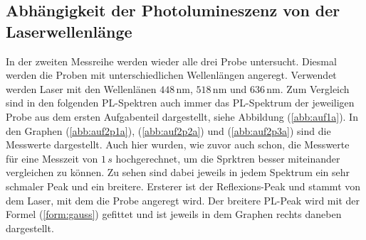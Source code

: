\subsection{Abhängigkeit der Photolumineszenz von der Laserwellenlänge}
In der zweiten Messreihe werden wieder alle drei Probe untersucht.
Diesmal werden die Proben mit unterschiedlichen Wellenl\"{a}ngen angeregt.
Verwendet werden Laser mit den Wellenl\"{a}nen $448 \,$nm, $518 \,$nm und $636 \,$nm.
Zum Vergleich sind in den folgenden PL-Spektren auch immer das PL-Spektrum der jeweiligen Probe aus dem ersten Aufgabenteil dargestellt, siehe Abbildung (\ref{abb:auf1a}).
In den Graphen (\ref{abb:auf2p1a}), (\ref{abb:auf2p2a}) und (\ref{abb:auf2p3a}) sind die Messwerte dargestellt.
Auch hier wurden, wie zuvor auch schon, die Messwerte f\"{u}r eine Messzeit von $1 \, s$ hochgerechnet, um die Sprktren besser miteinander vergleichen zu k\"{o}nnen.
Zu sehen sind dabei jeweils in jedem Spektrum ein sehr schmaler Peak und ein breitere.
Ersterer ist der Reflexions-Peak und stammt von dem Laser, mit dem die Probe angeregt wird.
Der breitere PL-Peak wird mit der Formel (\ref{form:gauss}) gefittet und ist jeweils in dem Graphen rechts daneben dargestellt.


